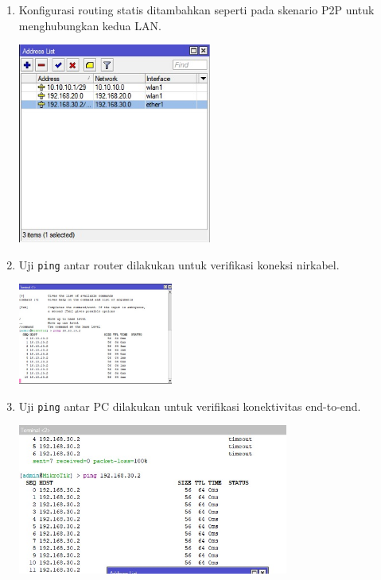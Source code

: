 \begin{enumerate}
    \item Konfigurasi routing statis ditambahkan seperti pada skenario P2P untuk menghubungkan kedua LAN.
    \begin{center}
        \includegraphics[width=0.5\textwidth]{img/address.jpg} %
    \end{center}
    \item Uji \texttt{ping} antar router dilakukan untuk verifikasi koneksi nirkabel.
    \begin{center}
        \includegraphics[width=0.4\textwidth]{img/pingrslt3.jpg} %
    \end{center}
    \item Uji \texttt{ping} antar PC dilakukan untuk verifikasi konektivitas end-to-end.
    \begin{center}
        \includegraphics[width=0.7\textwidth]{img/pingrslt2.jpg} %
    \end{center}
\end{enumerate}

